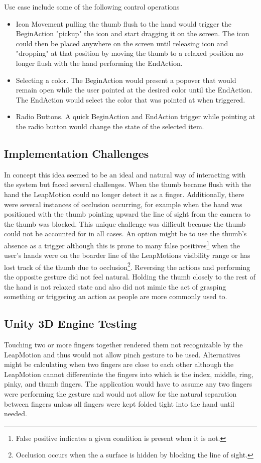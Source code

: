 Use case include some of the following control operations

\begin{itemize}
\item Icon Movement pulling the thumb flush to the hand would trigger the BeginAction "pickup" the icon and start dragging it on the screen. The icon could then be placed anywhere on the screen until releasing icon and "dropping" at that position by moving the thumb to a relaxed position no longer flush with the hand performing the EndAction.
\item Selecting a color. The BeginAction would present a popover that would remain open while the user pointed at the desired color until the EndAction. The EndAction would select the color that was pointed at when triggered. 
\item Radio Buttons. A quick BeginAction and EndAction trigger while pointing at the radio button would change the state of the selected item. 
\end{itemize}

\subsection{Implementation Challenges}
In concept this idea seemed to be an ideal and natural way of interacting with the system but faced several challenges. When the thumb became flush with the hand the LeapMotion could no longer detect it as a finger. Additionally, there were several instances of occlusion occurring, for example when the hand was positioned with the thumb pointing upward the line of sight from the camera to the thumb was blocked. This unique challenge was difficult because the thumb could not be accounted for in all cases. An option might be to use the thumb's absence as a trigger although this is prone to many false positives\footnote{False positive indicates a given condition is present when it is not.} when the user's hands were on the boarder line of the LeapMotions visibility range or has lost track of the thumb due to occlusion\footnote{Occlusion occurs when the a surface is hidden by blocking the line of sight.}. Reversing the actions and performing the opposite gesture did not feel natural. Holding the thumb closely to the rest of the hand is not relaxed state and also did not mimic the act of grasping something or triggering an action as people are more commonly used to. 


\subsection{Unity 3D Engine Testing}
Touching two or more fingers together rendered them not recognizable by the LeapMotion and thus would not allow pinch gesture to be used. Alternatives might be calculating when two fingers are close to each other although the LeapMotion cannot differentiate the fingers into which is the index, middle, ring, pinky, and thumb fingers. The application would have to assume any two fingers were performing the gesture and would not allow for the natural separation between fingers unless all fingers were kept folded tight into the hand until needed. 

